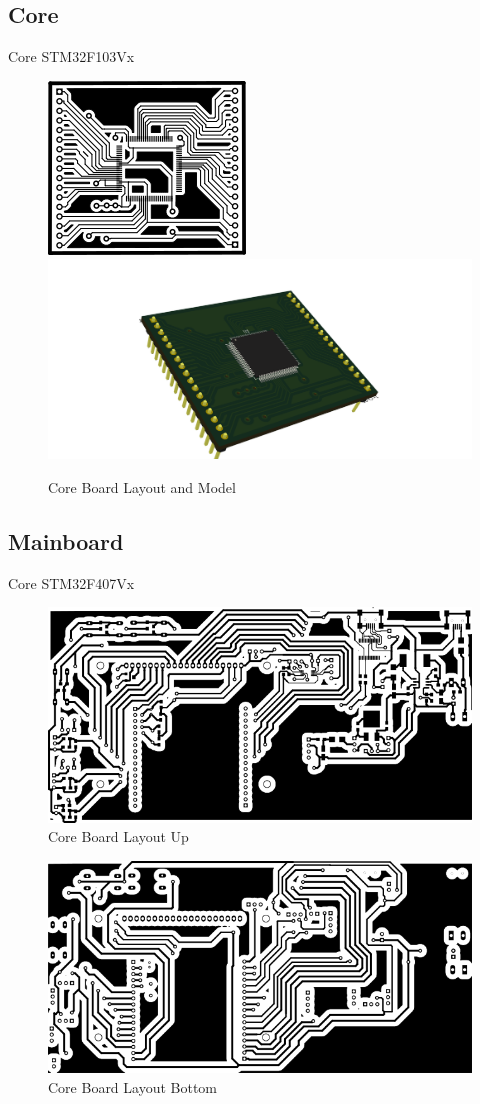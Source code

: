 \documentclass[12pt,]{book}
\begin{document}
	\subsection{Core}
	Core STM32F103Vx
	\begin{figure}[H]
		\centering
		\includegraphics[width=0.3\linewidth]{images/old_core_Fcu}
		\includegraphics[width=0.6\linewidth]{images/old_core_3d}
		\caption{Core Board Layout and Model}
	\end{figure}

	\subsection{Mainboard}
	Core STM32F407Vx
	\begin{figure}[H]
		\centering
		\includegraphics[width=0.7\linewidth]{images/old_board_Fcu}
		\caption{Core Board Layout Up}
	\end{figure}

	\begin{figure}[H]
		\centering
		\includegraphics[width=0.7\linewidth]{images/old_board_Bcu}
		\caption{Core Board Layout Bottom}
	\end{figure}
\end{document}
